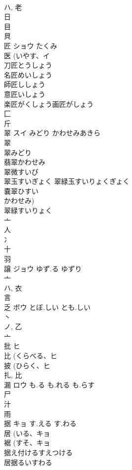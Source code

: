 \documentclass[8pt]{extreport}
\begin{document}
\begin{CJK}{UTF8}{min}
\\	ハ, 老 
\\	日 
\\	目 
\\	貝 
\\	匠	ショウ	たくみ	
\\	医 (いやす、イ 
\\	刀匠とうしょう
\\	名匠めいしょう
\\	師匠ししょう
\\	意匠いしょう
\\	楽匠がくしょう画匠がしょう
\\	匚 
\\	斤 
\\	翠	スイ	みどり かわせみあきら	
\\	翠 
\\	翠みどり 
\\	翡翠かわせみ 
\\	翠微すいび 
\\	翠玉すいぎょく 翠緑玉すいりょくぎょく 
\\	嚢翠ひすい 
\\	かわせみ)
\\	翠緑すいりょく 
\\	亠 
\\	人 
\\	冫 
\\	十 
\\	羽 
\\	譲	ジョウ	ゆず.る ゆずり	
\\	亠 
\\	ハ, 衣 
\\	言 
\\	乏	ボウ	とぼ.しい とも.しい	
\\	丶 
\\	ノ, 乙 
\\	亠 
\\	批	ヒ		
\\	比 (くらべる、ヒ 
\\	披 (ひらく、ヒ 
\\	扎, 比 
\\	漏	ロウ	も.る も.れる も.らす	
\\	尸 
\\	汁 
\\	雨 
\\	据	キョ	す.える す.わる	
\\	居 (いる、キョ 
\\	裾 (すそ、キョ 
\\	据え付けるすえつける
\\	居据るいすわる

\end{CJK}
\end{document}
